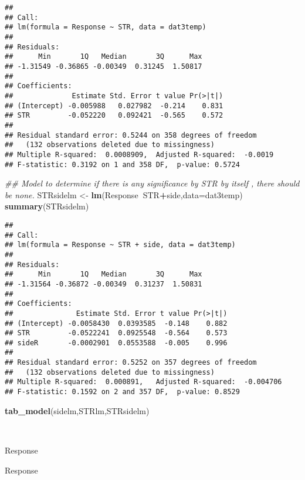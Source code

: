 \documentclass[
]{article}
\newenvironment{Shaded}{\begin{snugshade}}{\end{snugshade}}
\newcommand{\CommentTok}[1]{\textcolor[rgb]{0.56,0.35,0.01}{\textit{#1}}}
\newcommand{\DataTypeTok}[1]{\textcolor[rgb]{0.13,0.29,0.53}{#1}}
\newcommand{\KeywordTok}[1]{\textcolor[rgb]{0.13,0.29,0.53}{\textbf{#1}}}
\newcommand{\NormalTok}[1]{#1}
\newcommand{\OperatorTok}[1]{\textcolor[rgb]{0.81,0.36,0.00}{\textbf{#1}}}
\newcommand{\StringTok}[1]{\textcolor[rgb]{0.31,0.60,0.02}{#1}}
\begin{document}
\begin{verbatim}
## 
## Call:
## lm(formula = Response ~ STR, data = dat3temp)
## 
## Residuals:
##      Min       1Q   Median       3Q      Max 
## -1.31549 -0.36865 -0.00349  0.31245  1.50817 
## 
## Coefficients:
##              Estimate Std. Error t value Pr(>|t|)
## (Intercept) -0.005988   0.027982  -0.214    0.831
## STR         -0.052220   0.092421  -0.565    0.572
## 
## Residual standard error: 0.5244 on 358 degrees of freedom
##   (132 observations deleted due to missingness)
## Multiple R-squared:  0.0008909,  Adjusted R-squared:  -0.0019 
## F-statistic: 0.3192 on 1 and 358 DF,  p-value: 0.5724
\end{verbatim}

\begin{Shaded}
\begin{Highlighting}[]
\CommentTok{## Model to determine if there is any significance by STR by itself , there should be none.}
\NormalTok{STRsidelm <-}\StringTok{ }\KeywordTok{lm}\NormalTok{(Response}\OperatorTok{~}\NormalTok{STR}\OperatorTok{+}\NormalTok{side,}\DataTypeTok{data=}\NormalTok{dat3temp)}
\KeywordTok{summary}\NormalTok{(STRsidelm)}
\end{Highlighting}
\end{Shaded}

\begin{verbatim}
## 
## Call:
## lm(formula = Response ~ STR + side, data = dat3temp)
## 
## Residuals:
##      Min       1Q   Median       3Q      Max 
## -1.31564 -0.36872 -0.00349  0.31237  1.50831 
## 
## Coefficients:
##               Estimate Std. Error t value Pr(>|t|)
## (Intercept) -0.0058430  0.0393585  -0.148    0.882
## STR         -0.0522241  0.0925548  -0.564    0.573
## sideR       -0.0002901  0.0553588  -0.005    0.996
## 
## Residual standard error: 0.5252 on 357 degrees of freedom
##   (132 observations deleted due to missingness)
## Multiple R-squared:  0.000891,   Adjusted R-squared:  -0.004706 
## F-statistic: 0.1592 on 2 and 357 DF,  p-value: 0.8529
\end{verbatim}

\begin{Shaded}
\begin{Highlighting}[]
\KeywordTok{tab_model}\NormalTok{(sidelm,STRlm,STRsidelm)}
\end{Highlighting}
\end{Shaded}

~

Response

Response
\end{document}

